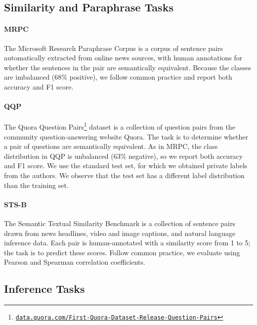 \subsection{Similarity and Paraphrase Tasks}

\paragraph{MRPC}
The Microsoft Research Paraphrase Corpus \citep{dolan2005automatically} is a corpus of sentence pairs automatically extracted from online news sources, with human annotations for whether the sentences in the pair are semantically equivalent. Because the classes are imbalanced (68\% positive), we follow common practice and report both accuracy and F1 score.

\paragraph{QQP}
The Quora Question Pairs\footnote{ \href{https://data.quora.com/First-Quora-Dataset-Release-Question-Pairs}{\texttt{data.quora.com/\allowbreak First-\allowbreak Quora-\allowbreak Dataset-\allowbreak Release-Question-Pairs}}} dataset is a collection of question pairs from the community question-answering website Quora. The task is to determine whether a pair of questions are semantically equivalent. As in MRPC, the class distribution in QQP is unbalanced (63\% negative), so we report both accuracy and F1 score. We use the standard test set, for which we obtained private labels from the authors. We observe that the test set has a different label distribution than the training set.

\paragraph{STS-B}
The Semantic Textual Similarity Benchmark \citep{cer2017semeval} is a collection of sentence pairs drawn from news headlines, video and image captions, and natural language inference data. 
Each pair is human-annotated with a similarity score from 1 to 5; the task is to predict these scores.
Follow common practice, we evaluate using Pearson and Spearman correlation coefficients.

\subsection{Inference Tasks}

